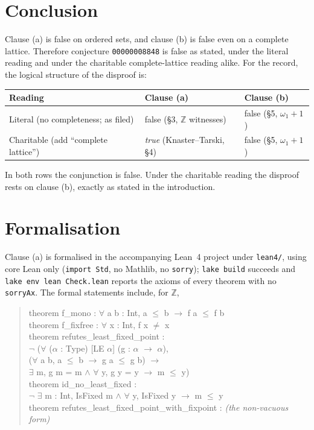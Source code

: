 \documentclass[11pt]{article}
\theoremstyle{definition}
\theoremstyle{remark}
\newcommand{\Z}{\mathbb{Z}}
\begin{document}
\section{Conclusion}

Clause (a) is false on ordered sets, and clause (b) is false even on a complete
lattice. Therefore conjecture \texttt{00000008848} is false as stated, under
the literal reading and under the charitable complete-lattice reading alike.
For the record, the logical structure of the disproof is:

\begin{center}
\begin{tabular}{@{}l l l@{}}
\toprule
Reading & Clause (a) & Clause (b) \\
\midrule
Literal (no completeness; as filed) & false (\S3, $\Z$ witnesses) & false (\S5, $\omega_1+1$) \\
Charitable (add ``complete lattice'') & \emph{true} (Knaster--Tarski, \S4) & false (\S5, $\omega_1+1$) \\
\bottomrule
\end{tabular}
\end{center}

\noindent In both rows the conjunction is false. Under the charitable reading
the disproof rests on clause (b), exactly as stated in the introduction.

\section{Formalisation}

Clause (a) is formalised in the accompanying Lean~4 project under
\texttt{lean4/}, using core Lean only (\texttt{import Std}, no Mathlib, no
\texttt{sorry}); \texttt{lake build} succeeds and \texttt{lake env lean
Check.lean} reports the axioms of every theorem with no \texttt{sorryAx}. The
formal statements include, for $\Z$,

\begin{quote}\ttfamily
theorem f\_mono : \(\forall\) a b : Int, a \(\le\) b \(\to\) f a \(\le\) f b\\
theorem f\_fixfree : \(\forall\) x : Int, f x \(\neq\) x\\
theorem refutes\_least\_fixed\_point :\\
\hspace*{2em}\(\neg\) (\(\forall\) (\(\alpha\) : Type) [LE \(\alpha\)] (g : \(\alpha\) \(\to\) \(\alpha\)),\\
\hspace*{4em}(\(\forall\) a b, a \(\le\) b \(\to\) g a \(\le\) g b) \(\to\)\\
\hspace*{4em}\(\exists\) m, g m = m \(\wedge\) \(\forall\) y, g y = y \(\to\) m \(\le\) y)\\
theorem id\_no\_least\_fixed :\\
\hspace*{2em}\(\neg\) \(\exists\) m : Int, IsFixed m \(\wedge\) \(\forall\) y, IsFixed y \(\to\) m \(\le\) y\\
theorem refutes\_least\_fixed\_point\_with\_fixpoint : \textit{(the non-vacuous form)}
\end{quote}
\end{document}
